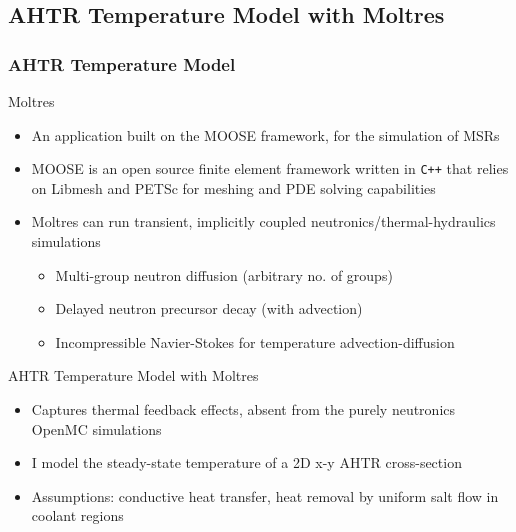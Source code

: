 \subsection{AHTR Temperature Model with Moltres}
\begin{frame}
    \frametitle{AHTR Temperature Model}
    \begin{block}{Moltres \cite{lindsay_introduction_2018}}
        \begin{itemize}
			\item An application built on the \gls{MOOSE} framework, for the simulation of 
            MSRs
            \item \gls{MOOSE} \cite{gaston_moose:_2009} is an open source finite
			element framework written in \texttt{C++} that
			relies on Libmesh and PETSc for meshing and PDE solving capabilities
			\item Moltres can run transient, implicitly coupled
			neutronics/thermal-hydraulics simulations
			\begin{itemize}
				\item Multi-group neutron diffusion (arbitrary no. of groups)
				\item Delayed neutron precursor decay (with advection)
				\item Incompressible Navier-Stokes for temperature
				advection-diffusion
			\end{itemize}
		\end{itemize}
    \vspace{-0.2cm}
    \end{block}
    \begin{block}{AHTR Temperature Model with Moltres}
        \begin{itemize}
            \item Captures thermal feedback effects, absent from the purely neutronics OpenMC
            simulations
            \item I model the steady-state temperature of a 2D x-y AHTR cross-section
            \item Assumptions: conductive heat transfer, heat removal by uniform 
            salt flow in coolant regions
        \end{itemize}
    \end{block}
\end{frame}

